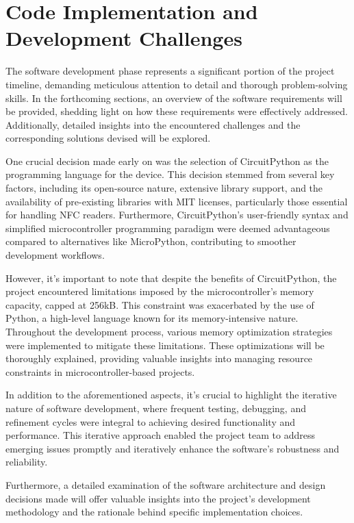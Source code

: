 \chapter{Code Implementation and Development Challenges}
\label{cap:codeAndChallenges}

The software development phase represents a significant portion of the project timeline, demanding 
meticulous attention to detail and thorough problem-solving skills. In the forthcoming sections, 
an overview of the software requirements will be provided, shedding light on how these 
requirements were effectively addressed. Additionally, detailed insights into the encountered 
challenges and the corresponding solutions devised will be explored.

One crucial decision made early on was the selection of CircuitPython as the programming language 
for the device. This decision stemmed from several key factors, including its open-source nature, 
extensive library support, and the availability of pre-existing libraries with MIT licenses, 
particularly those essential for handling NFC readers. Furthermore, CircuitPython's user-friendly 
syntax and simplified microcontroller programming paradigm were deemed advantageous compared to 
alternatives like MicroPython, contributing to smoother development workflows.

However, it's important to note that despite the benefits of CircuitPython, the project encountered 
limitations imposed by the microcontroller's memory capacity, capped at 256kB. This constraint was 
exacerbated by the use of Python, a high-level language known for its memory-intensive nature. 
Throughout the development process, various memory optimization strategies were implemented to 
mitigate these limitations. These optimizations will be thoroughly explained, providing valuable 
insights into managing resource constraints in microcontroller-based projects.

In addition to the aforementioned aspects, it's crucial to highlight the iterative nature of 
software development, where frequent testing, debugging, and refinement cycles were integral to 
achieving desired functionality and performance. This iterative approach enabled the project team 
to address emerging issues promptly and iteratively enhance the software's robustness and 
reliability.

Furthermore, a detailed examination of the software architecture and design decisions made will 
offer valuable insights into the project's development methodology and the rationale behind 
specific implementation choices.

